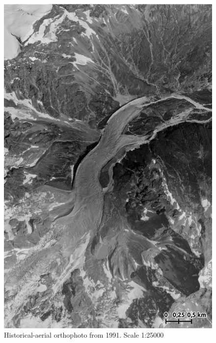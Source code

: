 \begin{figure}[p]
    \centering
    \includegraphics[width=\textwidth]{figures/appendix/orto_1991.jpg}
    \caption{Historical-aerial orthophoto from 1991. Scale 1:25000}
\end{figure}

